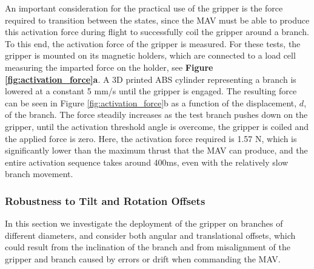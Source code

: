 An important consideration for the practical use of the gripper is the force required to transition between the states, since the MAV must be able to produce this activation force during flight to successfully coil the gripper around a branch. To this end, the activation force of the gripper is measured. For these tests, the gripper is mounted on its magnetic holders, which are connected to a load cell measuring the imparted force on the holder, see \textbf{Figure \ref{fig:activation_force}a}. A 3D printed ABS cylinder representing a branch is lowered at a constant 5 mm/s until the gripper is engaged. The resulting force can be seen in Figure \ref{fig:activation_force}b as a function of the displacement, $d$, of the branch. The force steadily increases as the test branch pushes down on the gripper, until the activation threshold angle is overcome, the gripper is coiled and the applied force is zero. Here, the activation force required is 1.57 N, which is significantly lower than the maximum thrust that the MAV can produce, and the entire activation sequence takes around 400ms, even with the relatively slow  branch movement.

\subsubsection{Robustness to Tilt and Rotation Offsets}
In this section we investigate the deployment of the gripper on branches of different diameters, and consider both angular and translational offsets, which could result from the inclination of the branch and from misalignment of the gripper and branch caused by errors or drift when commanding the MAV.

